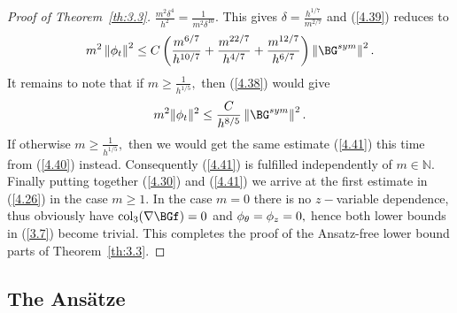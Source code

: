 \begin{proof}[Proof of Theorem~{\ref{th:3.3}}]
$\frac{m^2\delta^4}{h^2}=\frac{1}{m^2\delta^{10}}$. This gives $\delta=\frac{h^{1/7}}{m^{2/7}}$ and (\ref{4.39}) reduces to 
\begin{equation}
\label{4.43}
m^2\norm{\phi_t}^2\leq C \left(\frac{m^{6/7}}{h^{10/7}}+\frac{m^{22/7}}{h^{4/7}}+\frac{m^{12/7}}{h^{6/7}}\right)\norm{\BG^{sym}}^2.
\end{equation} 
It remains to note that if $m\geq\frac{1}{ h^{1/5}},$ then (\ref{4.38}) would give 
\begin{equation}
\label{4.44}
m^2\|\phi_t\|^2 \leq \frac{C}{h^{8/5}}\norm{\BG^{sym}}^2.
\end{equation}
If otherwise $m\geq\frac{1}{ h^{1/5}},$ then we would get the same estimate (\ref{4.41}) this time from (\ref{4.40}) instead. Consequently (\ref{4.41}) is fulfilled independently of $m\in\mathbb N.$ Finally putting together (\ref{4.30}) and (\ref{4.41}) we arrive at the first estimate in (\ref{4.26}) in the case $m\geq 1.$ 
In the case $m=0$ there is no $z-$variable dependence, thus obviously have $\mathrm{col}_3(\nabla\BGf)=0$ and $\phi_\theta=\phi_z=0,$ hence both lower bounds in 
(\ref{3.7}) become trivial. This completes the proof of the Ansatz-free lower bound parts of Theorem~\ref{th:3.3}.


\end{proof}



\subsection{The Ans\"atze}

